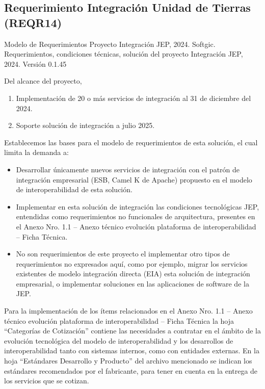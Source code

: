 \documentclass[
  paper=a4,
  ,captions=tableheading
]{scrartcl}
\providecommand{\tightlist}{%
  \setlength{\itemsep}{0pt}\setlength{\parskip}{0pt}}
\renewenvironment{quote}{\begin{customblockquote}\list{}{\rightmargin=0em\leftmargin=0em}%
\item\relax\color{blockquote-text}\ignorespaces}{\unskip\unskip\endlist\end{customblockquote}}
\begin{document}
\subsection{Requerimiento Integración Unidad de Tierras
(REQR14)}\label{sec:requerimiento-integraciuxf3n-unidad-de-tierras-reqr14}

\begin{quote}
Modelo de Requerimientos Proyecto Integración JEP, 2024. Softgic.
Requerimientos, condiciones técnicas, solución del proyecto Integración
JEP, 2024. Versión 0.1.45
\end{quote}

Del alcance del proyecto,

\begin{enumerate}
\def\labelenumi{\arabic{enumi}.}
\tightlist
\item
  Implementación de 20 o más servicios de integración al 31 de diciembre
  del 2024.
\item
  Soporte solución de integración a julio 2025.
\end{enumerate}

Establecemos las bases para el modelo de requerimientos de esta
solución, el cual limita la demanda a:

\begin{itemize}
\tightlist
\item
  Desarrollar únicamente nuevos servicios de integración con el patrón
  de integración empresarial (ESB, Camel K de Apache) propuesto en el
  modelo de interoperabilidad de esta solución.
\item
  Implementar en esta solución de integración las condiciones
  tecnológicas JEP, entendidas como requerimientos no funcionales de
  arquitectura, presentes en el Anexo Nro. 1.1 -- Anexo técnico
  evolución plataforma de interoperabilidad -- Ficha Técnica.
\item
  No son requerimientos de este proyecto el implementar otro tipos de
  requerimientos no expresados aquí, como por ejemplo, migrar los
  servicios existentes de modelo integración directa (EIA) esta solución
  de integración empresarial, o implementar soluciones en las
  aplicaciones de software de la JEP.
\end{itemize}

Para la implementación de los ítems relacionados en el Anexo Nro. 1.1 --
Anexo técnico evolución plataforma de interoperabilidad -- Ficha Técnica
la hoja ``Categorías de Cotización'' contiene las necesidades a
contratar en el ámbito de la evolución tecnológica del modelo de
interoperabilidad y los desarrollos de interoperabilidad tanto con
sistemas internos, como con entidades externas. En la hoja ``Estándares
Desarrollo y Producto'' del archivo mencionado se indican los estándares
recomendados por el fabricante, para tener en cuenta en la entrega de
los servicios que se cotizan.
\end{document}
